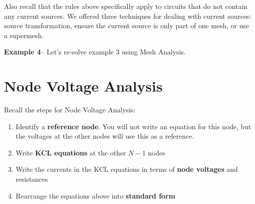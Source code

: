\documentclass{handout}
\begin{document}
Also recall that the rules above specifically apply to circuits that do not contain any current sources.  We offered three techniques for dealing with current sources: source transformation, ensure the current source is only part of one mesh,  or use a supermesh.

\textbf{Example 4}-- Let's re-solve example 3 using Mesh Analysis.

\newpage
\clearpage
\pagebreak

\section{Node Voltage Analysis}
Recall the steps for Node Voltage Analysis:
\begin{enumerate}
\item Identify a \textbf{reference node}.  You will not write an equation for this node, but the voltages at the other nodes will use this as a reference.
\item Write \textbf{KCL equations} at the other $N-1$ nodes
\item Write the currents in the KCL equations in terms of \textbf{node voltages} and resistances
\item Rearrange the equations above into \textbf{standard form}
\end{enumerate}
\end{document}
